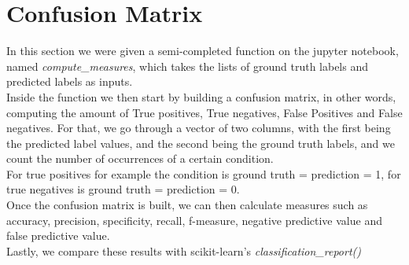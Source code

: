 \documentclass{thesisreport}
\begin{document}
\section{Confusion Matrix}
In this section we were given a semi-completed function on the jupyter notebook, named \textit{compute\_measures}, which takes the lists of ground truth labels and predicted labels as inputs.\\
Inside the function we then start by building a confusion matrix, in other words, computing the amount of True positives, True negatives, False Positives and False negatives. For that, we go through a vector of two columns, with the first being the predicted label values, and the second being the ground truth labels, and we count the number of occurrences of a certain condition.\\
For true positives for example the condition is ground truth = prediction = 1, for true negatives is ground truth = prediction = 0.\\
Once the confusion matrix is built, we can then calculate measures such as accuracy, precision, specificity, recall, f-measure, negative predictive value and false predictive value.\\
Lastly, we compare these results with scikit-learn's \textit{classification\_report()}


\newpage
\end{document}
